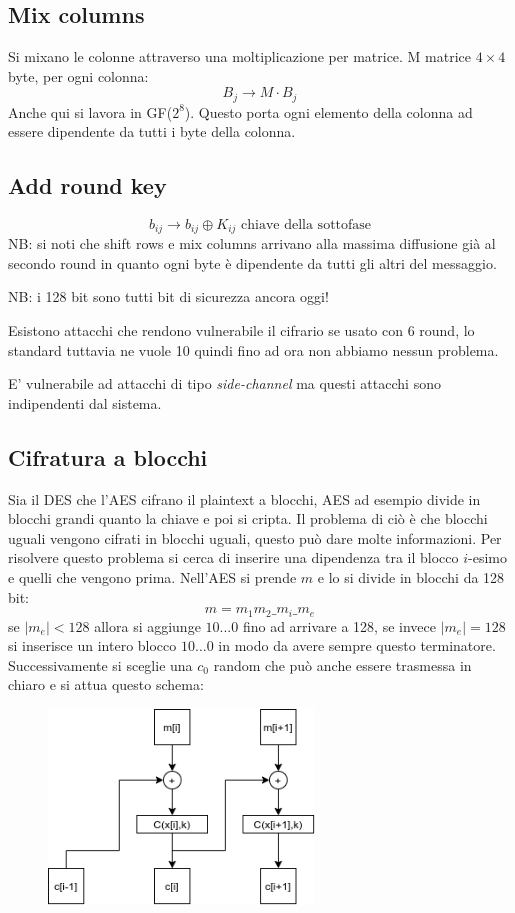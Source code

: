 \subsection{Mix columns}
Si mixano le colonne attraverso una moltiplicazione per matrice.
M matrice $4 \times 4$ byte, per ogni colonna:
$$
    B_{j} \xrightarrow{} M \cdot B_{j}
$$
Anche qui si lavora in GF($2^8$). Questo porta ogni elemento della colonna ad essere dipendente da tutti i byte della colonna.

\subsection{Add round key}
$$
    b_{ij} \xrightarrow{} b_{ij} \oplus K_{ij} \text{ chiave della sottofase}
$$
NB: si noti che shift rows e mix columns arrivano alla massima diffusione già al secondo round in quanto ogni byte è dipendente da tutti gli altri del messaggio.

NB: i 128 bit sono tutti bit di sicurezza ancora oggi!

Esistono attacchi che rendono vulnerabile il cifrario se usato con 6 round, lo standard tuttavia ne vuole 10 quindi fino ad ora non abbiamo nessun problema.

E' vulnerabile ad attacchi di tipo \emph{side-channel} ma questi attacchi sono indipendenti dal sistema.

\subsection{Cifratura a blocchi}
Sia il DES che l'AES cifrano il plaintext a blocchi, AES ad esempio divide in blocchi grandi quanto la chiave e poi si cripta.
Il problema di ciò è che blocchi uguali vengono cifrati in blocchi uguali, questo può dare molte informazioni.
Per risolvere questo problema si cerca di inserire una dipendenza tra il blocco $i$-esimo e quelli che vengono prima.
Nell'AES si prende $m$ e lo si divide in blocchi da 128 bit:
$$ m = m_{1}m_{2}\_m_{i}\_m_{e} $$
se $\mid m_e \mid < 128$ allora si aggiunge $10...0$ fino ad arrivare a 128, se invece $\mid m_e \mid = 128$ si inserisce un intero blocco $10...0$ in modo da avere sempre questo terminatore.
Successivamente si sceglie una $c_0$ random che può anche essere trasmessa in chiaro e si attua questo schema:
\begin{figure}[H]
    \centering
    \includegraphics[width = 200pt]{CBC.png}
\end{figure}

